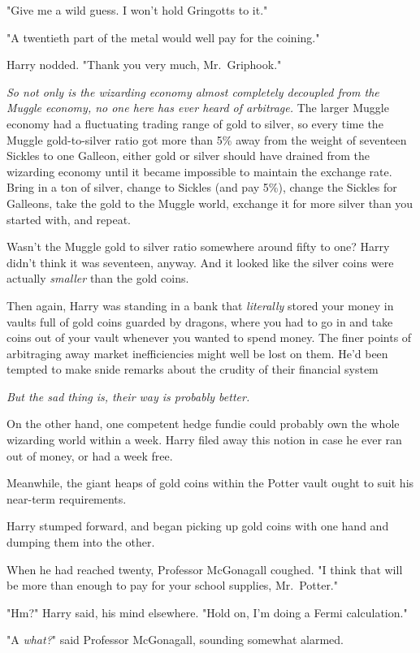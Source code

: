 "Give me a wild guess. I won't hold Gringotts to it."

"A twentieth part of the metal would well pay for the coining."

Harry nodded. "Thank you very much, Mr.~Griphook."

\emph{So not only is the wizarding economy almost completely decoupled from the
Muggle economy, no one here has ever heard of arbitrage.} The larger Muggle
economy had a fluctuating trading range of gold to silver, so every time the
Muggle gold-to-silver ratio got more than 5\% away from the weight of seventeen
Sickles to one Galleon, either gold or silver should have drained from the
wizarding economy until it became impossible to maintain the exchange rate.
Bring in a ton of silver, change to Sickles (and pay 5\%), change the Sickles
for Galleons, take the gold to the Muggle world, exchange it for more silver
than you started with, and repeat.

Wasn't the Muggle gold to silver ratio somewhere around fifty to one? Harry
didn't think it was seventeen, anyway. And it looked like the silver coins were
actually \emph{smaller} than the gold coins.

Then again, Harry was standing in a bank that \emph{literally} stored your
money in vaults full of gold coins guarded by dragons, where you had to go in
and take coins out of your vault whenever you wanted to spend money. The finer
points of arbitraging away market inefficiencies might well be lost on them.
He'd been tempted to make snide remarks about the crudity of their financial
system{\el}

\emph{But the sad thing is, their way is probably better.}

On the other hand, one competent hedge fundie could probably own the whole
wizarding world within a week. Harry filed away this notion in case he ever ran
out of money, or had a week free.

Meanwhile, the giant heaps of gold coins within the Potter vault ought to suit
his near-term requirements.

Harry stumped forward, and began picking up gold coins with one hand and
dumping them into the other.

When he had reached twenty, Professor McGonagall coughed. "I think that will be
more than enough to pay for your school supplies, Mr.~Potter."

"Hm?" Harry said, his mind elsewhere. "Hold on, I'm doing a Fermi calculation."

"A \emph{what?}" said Professor McGonagall, sounding somewhat alarmed.

